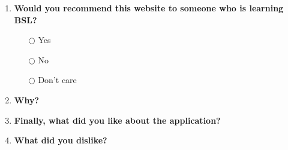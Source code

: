 \documentclass[12pt]{ociamthesis}  %
\let\mtcleardoublepage\cleardoublepage
\renewcommand{\cleardoublepage}{\clearpage{\pagestyle{plain}\mtcleardoublepage}}
\begin{document}
{\begin{enumerate}[resume]
	\item \textbf{Would you recommend this website to someone who is learning BSL?}
	
	\begin{enumerate}
		\item[$\bigcirc$] Yes
		\item[$\bigcirc$] No
		\item[$\bigcirc$] Don't care
	\end{enumerate}

	\item \textbf{Why?}
	\par \dotfill
	
	\item \textbf{Finally, what did you like about the application?}
	\par \dotfill
	
	\item \textbf{What did you dislike?}
	\par \dotfill
	
\end{enumerate}
\cleardoublepage}
\end{document}
